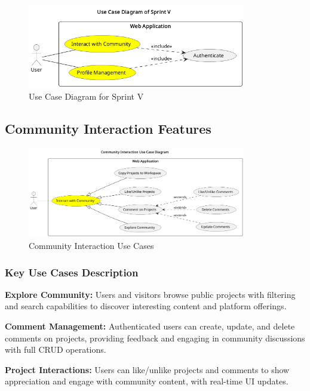 \begin{figure}[H]
\centering
\includegraphics[width=0.85\textwidth]{conception/SprintV/use_case_diagrams/use_case_diagram_of_SprintV.png}
\caption{Use Case Diagram for Sprint V}
\label{fig:use_case_sprint_v}
\end{figure}

\subsection{Community Interaction Features}

\begin{figure}[H]
\centering
\includegraphics[width=0.85\textwidth]{conception/SprintV/use_case_diagrams/refined_use_case_feature_community_interaction.png}
\caption{Community Interaction Use Cases}
\label{fig:community_interaction_use_case}
\end{figure}

\subsubsection{Key Use Cases Description}

\textbf{Explore Community:} Users and visitors browse public projects with filtering and search capabilities to discover interesting content and platform offerings.

\textbf{Comment Management:} Authenticated users can create, update, and delete comments on projects, providing feedback and engaging in community discussions with full CRUD operations.

\textbf{Project Interactions:} Users can like/unlike projects and comments to show appreciation and engage with community content, with real-time UI updates.

